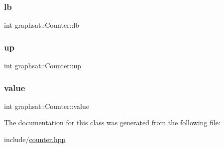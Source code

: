 \subsubsection{\texorpdfstring{lb}{lb}}
{\footnotesize\ttfamily int graphsat\+::\+Counter\+::lb\hspace{0.3cm}{\ttfamily [private]}}

\mbox{\label{classgraphsat_1_1_counter_a782128acfad183e7758d9fb899c9afb2}} 
\subsubsection{\texorpdfstring{up}{up}}
{\footnotesize\ttfamily int graphsat\+::\+Counter\+::up\hspace{0.3cm}{\ttfamily [private]}}

\mbox{\label{classgraphsat_1_1_counter_aeefe32c89acd4509360886f8c037683c}} 
\subsubsection{\texorpdfstring{value}{value}}
{\footnotesize\ttfamily int graphsat\+::\+Counter\+::value\hspace{0.3cm}{\ttfamily [private]}}



The documentation for this class was generated from the following file\+:\begin{DoxyCompactItemize}
\item 
include/\mbox{\hyperlink{counter_8hpp}{counter.\+hpp}}\end{DoxyCompactItemize}
